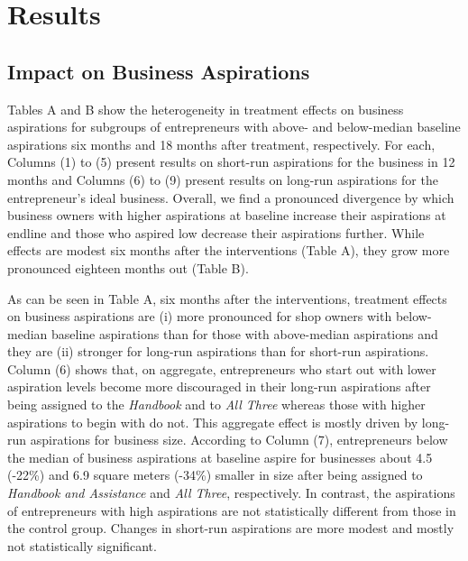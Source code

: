 \documentclass[11.5pt]{article}
\begin{document}
\section{Results}\label{sec.analysis}

\subsection{Impact on Business Aspirations}

Tables A and B show the heterogeneity in treatment effects on business aspirations for subgroups of entrepreneurs with above- and below-median baseline aspirations six months and 18 months after treatment, respectively. %
For each, Columns (1) to (5) present results on short-run aspirations for the business in 12 months and Columns (6) to (9) present results on long-run aspirations for the entrepreneur's ideal business. Overall, we find a pronounced divergence by which business owners with higher aspirations at baseline increase their aspirations at endline and those who aspired low decrease their aspirations further. While effects are modest six months after the interventions (Table A), they grow more pronounced eighteen months out (Table B).

As can be seen in Table A, six months after the interventions, treatment effects on business aspirations are (i) more pronounced for shop owners with below-median baseline aspirations than for those with above-median aspirations and they are (ii) stronger for long-run aspirations than for short-run aspirations. Column (6) shows that, on aggregate, entrepreneurs who start out with lower aspiration levels become more discouraged in their long-run aspirations after being assigned to the \emph{Handbook} and to \emph{All Three} whereas those with higher aspirations to begin with do not. %
This aggregate effect is mostly driven by long-run aspirations for business size. According to Column (7), entrepreneurs below the median of business aspirations at baseline aspire for businesses about 4.5 (-22\%) and 6.9 square meters (-34\%) smaller in size after being assigned to \emph{Handbook and Assistance} and \emph{All Three}, respectively. In contrast, the aspirations of entrepreneurs with high aspirations are not statistically different from those in the control group. Changes in short-run aspirations are more modest and mostly not statistically significant. \\ %
\end{document}

